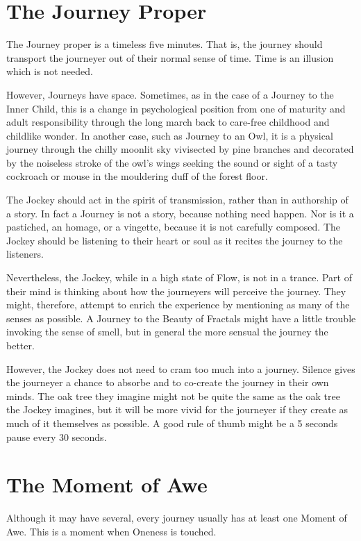 \documentclass[12pt]{book}
\begin{document}
\section{The Journey Proper}
					
The Journey proper is a timeless five minutes. That is, the journey should transport the journeyer out of their normal sense of time. Time is an illusion which is not needed.
					
However, Journeys have space. Sometimes, as in the case of a Journey to the Inner Child,
this is a change in psychological position from one of maturity and adult responsibility through the long march back to care-free childhood and childlike wonder.
In another case, such as Journey to an Owl, it is a physical journey through the chilly moonlit sky vivisected by pine branches and decorated by the noiseless stroke of the owl’s wings seeking the sound or sight of a tasty cockroach or mouse in the mouldering duff of the forest floor.
					
The Jockey should act in the spirit of transmission, rather than in authorship of a story. In fact a Journey is not a story, because nothing need happen. Nor is it a pastiched, an homage, or a vingette, because it is not carefully composed.
The Jockey should be listening to their heart or soul as it recites the journey to the listeners.
					
Nevertheless, the Jockey, while in a high state of Flow, is not in a trance. Part of their mind is thinking about how the journeyers will perceive the journey. They might, therefore, attempt to enrich the experience by mentioning as many of the senses as possible. A Journey to the Beauty of Fractals might have a little trouble invoking the sense of smell, but in general the more sensual the journey the better.
					
However, the Jockey does not need to cram too much into a journey. Silence gives the journeyer a chance to absorbe and to co-create the journey in their own minds. The oak tree they imagine might not be quite the same as the oak tree the Jockey imagines, but it will be more vivid for the journeyer if they create as much of it themselves as possible. A good rule of thumb might be a 5 seconds pause every 30 seconds.
					
\section{The Moment of Awe}
					
Although it may have several, every journey usually has at least one Moment of Awe. This is a moment when Oneness is touched.
					
\end{document}
